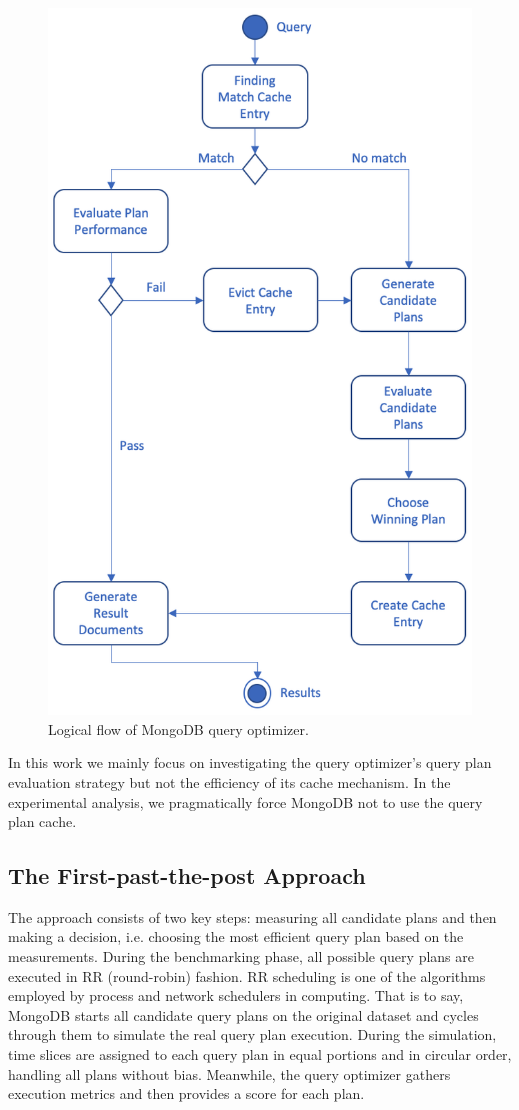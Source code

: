 \begin{figure}[ht]
  \centering
  \includegraphics[width=0.75\linewidth]{images/background/query_planner_before.png}
  \caption{Logical flow of MongoDB query optimizer.}
  \label{figure:logicflow}
\end{figure}

In this work we mainly focus on investigating the query optimizer's query plan evaluation strategy but not 
the efficiency of its cache mechanism. In the experimental analysis, we pragmatically force MongoDB not to use the query plan cache. 

\subsection{The First-past-the-post Approach}
The \approachName approach consists of two key steps: measuring all 
candidate plans and then making a decision, i.e. choosing the most 
efficient query plan based on the measurements. During the 
benchmarking phase, all possible query plans are executed in RR 
(round-robin) fashion. RR scheduling is one of the algorithms 
employed by process and network schedulers in computing. That 
is to say, MongoDB starts all candidate query plans on the original
dataset and cycles through them to simulate the real query plan execution. 
During the simulation, time slices are assigned to each query plan in 
equal portions and in circular order, handling all plans 
without bias. Meanwhile, the query optimizer gathers execution 
metrics and then provides a score for each plan. 

